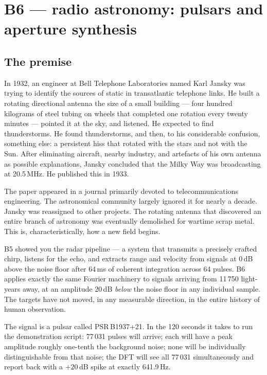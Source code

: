 \documentclass[11pt,a4paper,openany]{book}
\begin{document}
\chapter{B6 --- radio astronomy: pulsars and aperture synthesis}
\label{ch:b6}

\section{The premise}

In 1932, an engineer at Bell Telephone Laboratories named Karl Jansky was
trying to identify the sources of static in transatlantic telephone links. He
built a rotating directional antenna the size of a small building --- four
hundred kilograms of steel tubing on wheels that completed one rotation every
twenty minutes --- pointed it at the sky, and listened. He expected to find
thunderstorms. He found thunderstorms, and then, to his considerable
confusion, something else: a persistent hiss that rotated with the stars and
not with the Sun. After eliminating aircraft, nearby industry, and artefacts
of his own antenna as possible explanations, Jansky concluded that the Milky
Way was broadcasting at 20.5\,MHz. He published this in 1933.

The paper appeared in a journal primarily devoted to telecommunications
engineering. The astronomical community largely ignored it for nearly a
decade. Jansky was reassigned to other projects. The rotating antenna that
discovered an entire branch of astronomy was eventually demolished for
wartime scrap metal. This is, characteristically, how a new field begins.

B5 showed you the radar pipeline --- a system that transmits a precisely crafted
chirp, listens for the echo, and extracts range and velocity from signals at
0\,dB above the noise floor after 64\,ms of coherent integration across 64
pulses. B6 applies exactly the same Fourier machinery to signals arriving from
11\,750 light-years away, at an amplitude 20\,dB \emph{below} the noise floor
in any individual sample. The targets have not moved, in any measurable
direction, in the entire history of human observation.

The signal is a pulsar called PSR\,B1937+21. In the 120 seconds it takes to
run the demonstration script: 77\,031 pulses will arrive; each will have a
peak amplitude roughly one-tenth the background noise; none will be
individually distinguishable from that noise; the DFT will see all 77\,031
simultaneously and report back with a $+20$\,dB spike at exactly 641.9\,Hz.
\end{document}
